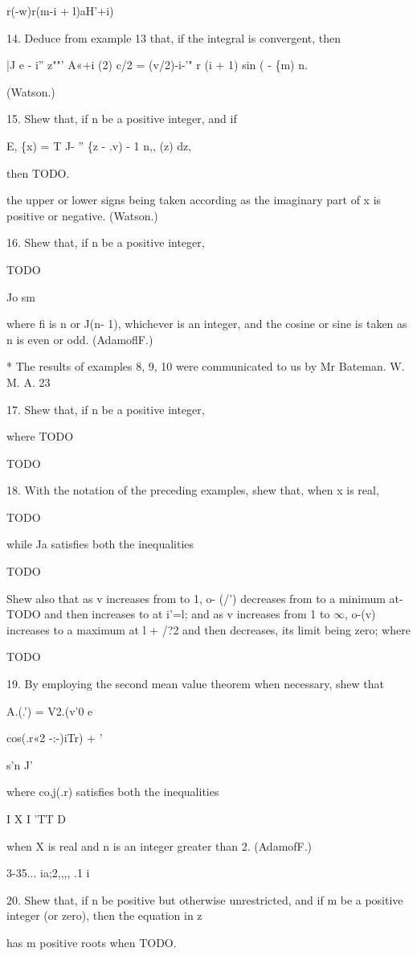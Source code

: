 r(-w)r(m-i + l)aH'+i)

14. Deduce from example 13 that, if the integral is convergent, then

|J e - i'' z""' A«+i (2) c/2 = (v/2)-i-'" r (i + 1) sin ( - \{m) n.

(Watson.)

15. Shew that, if n be a positive integer, and if

E, \{x) = T J- '' \{z - .v) - 1 n,, (z) dz,

then TODO.

the upper or lower signs being taken according as the imaginary part
of x is positive or negative. (Watson.)

16. Shew that, if n be a positive integer,

TODO

Jo sm

where fi is n or J(n- 1), whichever is an integer, and the cosine or
sine is taken as n is even or odd. (AdamoflF.)

* The results of examples 8, 9, 10 were communicated to us by Mr
Bateman. W. M. A. 23

%
%

17. Shew that, if n be a positive integer,

where TODO

TODO 

18. With the notation of the preceding examples, shew that, when x is
real,

TODO

while Ja satisfies both the inequalities

TODO

Shew also that as v increases from to 1, o- (/') decreases from to a
minimum at- TODO and then increases to at i'=l; and as v increases
from 1 to $\infty$, o-(v) increases to a maximum at l + /?2 and then
decreases, its limit being zero; where

TODO 

19. By employing the second mean value theorem when necessary, shew
that

A.(.') = V2.(v'0 e

cos(.r«2 -:-)iTr) + '

s'n J'

where co,j(.r) satisfies both the inequalities

I X I 'TT D

when X is real and n is an integer greater than 2. (AdamofF.)

3-35... ia;2,,,, .1 i

20. Shew that, if n be positive but otherwise unrestricted, and if m
be a positive integer (or zero), then the equation in z

has m positive roots when TODO. 